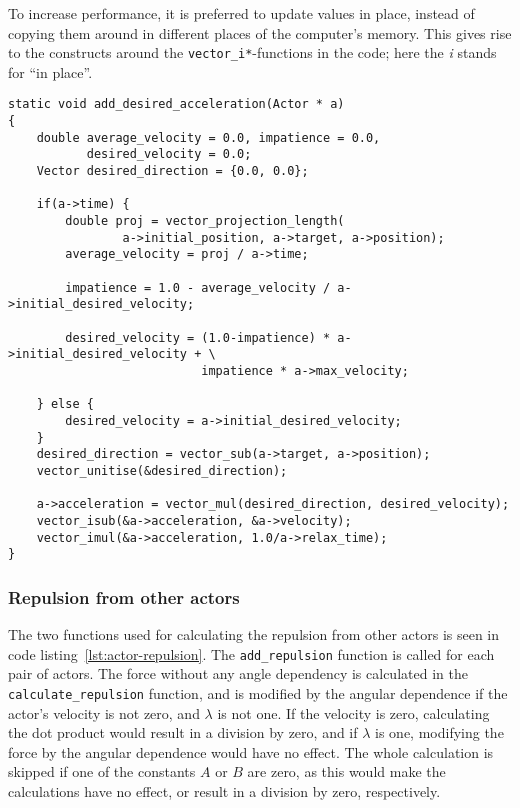 To increase performance, it is preferred to update values in place, instead of 
copying them around in different places of the computer's memory. This gives 
rise to the constructs around the \texttt{vector\_i*}-functions in the code; 
here the \emph{i} stands for ``in place''.

\begin{lstlisting}[caption={Code for calculating the desired 
    force.},label=lst:desired-force]
static void add_desired_acceleration(Actor * a)
{
    double average_velocity = 0.0, impatience = 0.0, 
           desired_velocity = 0.0;
    Vector desired_direction = {0.0, 0.0};

    if(a->time) {
        double proj = vector_projection_length(
                a->initial_position, a->target, a->position);
        average_velocity = proj / a->time;

        impatience = 1.0 - average_velocity / a->initial_desired_velocity;

        desired_velocity = (1.0-impatience) * a->initial_desired_velocity + \
                           impatience * a->max_velocity;

    } else {
        desired_velocity = a->initial_desired_velocity;
    }
    desired_direction = vector_sub(a->target, a->position);
    vector_unitise(&desired_direction);

    a->acceleration = vector_mul(desired_direction, desired_velocity);
    vector_isub(&a->acceleration, &a->velocity);
    vector_imul(&a->acceleration, 1.0/a->relax_time);
}
\end{lstlisting}

\subsubsection{Repulsion from other actors}
The two functions used for calculating the repulsion from other actors is seen 
in code listing~\ref{lst:actor-repulsion}. The \texttt{add\_repulsion} function 
is called for each pair of actors. The force without any angle dependency is 
calculated in the \texttt{calculate\_repulsion} function, and is modified by 
the angular dependence if the actor's velocity is not zero, and $\lambda$ is 
not one. If the velocity is zero, calculating the dot product would result in 
a division by zero, and if $\lambda$ is one, modifying the force by the 
angular dependence would have no effect. The whole calculation is skipped if 
one of the constants $A$ or $B$ are zero, as this would make the calculations 
have no effect, or result in a division by zero, respectively.

